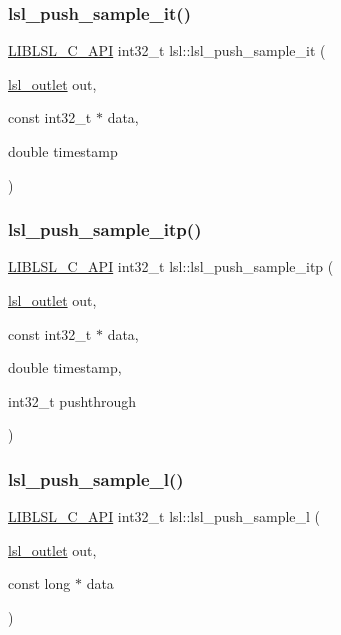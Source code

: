 \subsubsection{\texorpdfstring{lsl\+\_\+push\+\_\+sample\+\_\+it()}{lsl\_push\_sample\_it()}}
{\footnotesize\ttfamily \hyperlink{lsl__cpp_8h_aafd0ef1813e8be84a1420c4f1df64615}{L\+I\+B\+L\+S\+L\+\_\+\+C\+\_\+\+A\+PI} int32\+\_\+t lsl\+::lsl\+\_\+push\+\_\+sample\+\_\+it (\begin{DoxyParamCaption}\item[{\hyperlink{namespacelsl_abcf512b0f66dacf86c10b165995fd50b}{lsl\+\_\+outlet}}]{out,  }\item[{const int32\+\_\+t $\ast$}]{data,  }\item[{double}]{timestamp }\end{DoxyParamCaption})}

\mbox{\label{namespacelsl_aa0f3b0ccc233ebed00178e189c4678af}} 
\subsubsection{\texorpdfstring{lsl\+\_\+push\+\_\+sample\+\_\+itp()}{lsl\_push\_sample\_itp()}}
{\footnotesize\ttfamily \hyperlink{lsl__cpp_8h_aafd0ef1813e8be84a1420c4f1df64615}{L\+I\+B\+L\+S\+L\+\_\+\+C\+\_\+\+A\+PI} int32\+\_\+t lsl\+::lsl\+\_\+push\+\_\+sample\+\_\+itp (\begin{DoxyParamCaption}\item[{\hyperlink{namespacelsl_abcf512b0f66dacf86c10b165995fd50b}{lsl\+\_\+outlet}}]{out,  }\item[{const int32\+\_\+t $\ast$}]{data,  }\item[{double}]{timestamp,  }\item[{int32\+\_\+t}]{pushthrough }\end{DoxyParamCaption})}

\mbox{\label{namespacelsl_a44dd3e59bb5d7e95b9ffa60032207457}} 
\subsubsection{\texorpdfstring{lsl\+\_\+push\+\_\+sample\+\_\+l()}{lsl\_push\_sample\_l()}}
{\footnotesize\ttfamily \hyperlink{lsl__cpp_8h_aafd0ef1813e8be84a1420c4f1df64615}{L\+I\+B\+L\+S\+L\+\_\+\+C\+\_\+\+A\+PI} int32\+\_\+t lsl\+::lsl\+\_\+push\+\_\+sample\+\_\+l (\begin{DoxyParamCaption}\item[{\hyperlink{namespacelsl_abcf512b0f66dacf86c10b165995fd50b}{lsl\+\_\+outlet}}]{out,  }\item[{const long $\ast$}]{data }\end{DoxyParamCaption})}

